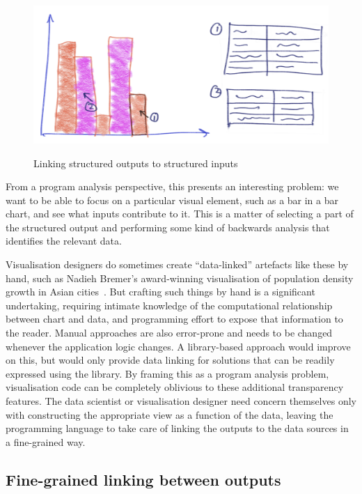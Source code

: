 \begin{figure}[H]
   {\includegraphics[scale=0.05]{fig/example/data-linking.png}}
   \caption{Linking structured outputs to structured inputs}
   \label{fig:introduction:data-linking}
\end{figure}

\noindent From a program analysis perspective, this presents an interesting problem: we want to be able to focus on a particular visual element, such as a bar in a bar chart, and see what inputs contribute to it. This is a matter of selecting a part of the structured output and performing some kind of backwards analysis that identifies the relevant data.

Visualisation designers do sometimes create ``data-linked'' artefacts like these by hand, such as Nadieh Bremer's award-winning visualisation of population density growth in Asian cities~\cite{bremer15}. But crafting such things by hand is a significant undertaking, requiring intimate knowledge of the computational relationship between chart and data, and programming effort to expose that information to the reader. Manual approaches are also error-prone and needs to be changed whenever the application logic changes. A library-based approach would improve on this, but would only provide data linking for solutions that can be readily expressed using the library. By framing this as a program analysis problem, visualisation code can be completely oblivious to these additional transparency features. The data scientist or visualisation designer need concern themselves only with constructing the appropriate view as a function of the data, leaving the programming language to take care of linking the outputs to the data sources in a fine-grained way.

\subsection{Fine-grained linking between outputs}

